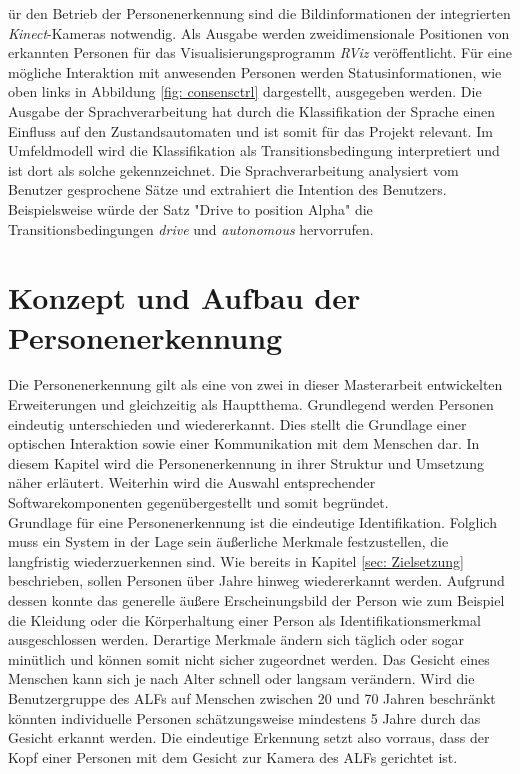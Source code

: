 	ür den Betrieb der Personenerkennung sind die Bildinformationen der integrierten \textit{Kinect}-Kameras notwendig. Als Ausgabe werden zweidimensionale Positionen von erkannten Personen für das Visualisierungsprogramm \textit{RViz} veröffentlicht. Für eine mögliche Interaktion mit anwesenden Personen werden Statusinformationen, wie oben links in Abbildung \ref{fig: consensctrl} dargestellt, ausgegeben werden. Die Ausgabe der Sprachverarbeitung hat durch die Klassifikation der Sprache einen Einfluss auf den Zustandsautomaten und ist somit für das Projekt relevant. Im Umfeldmodell wird die Klassifikation als Transitionsbedingung interpretiert und ist dort als solche gekennzeichnet. Die Sprachverarbeitung analysiert vom Benutzer gesprochene Sätze und extrahiert die Intention des Benutzers. Beispielsweise würde der Satz "Drive to position Alpha" die Transitionsbedingungen \textit{drive} und \textit{autonomous} hervorrufen. \\
		
	
	
	
	
	\section{Konzept und Aufbau der Personenerkennung}
	\label{sec: Konzept Personenerkennung}
	
	Die Personenerkennung gilt als eine von zwei in dieser Masterarbeit entwickelten Erweiterungen und gleichzeitig als Hauptthema. Grundlegend werden Personen eindeutig unterschieden und wiedererkannt. Dies stellt die Grundlage einer optischen Interaktion sowie einer Kommunikation mit dem Menschen dar. In diesem Kapitel wird die Personenerkennung in ihrer Struktur und Umsetzung näher erläutert. Weiterhin wird die Auswahl entsprechender Softwarekomponenten gegenübergestellt und somit begründet.\\
	
	Grundlage für eine Personenerkennung ist die eindeutige Identifikation. Folglich muss ein System in der Lage sein äußerliche Merkmale festzustellen, die langfristig wiederzuerkennen sind. Wie bereits in Kapitel \ref{sec: Zielsetzung} beschrieben, sollen Personen über Jahre hinweg wiedererkannt werden. Aufgrund dessen konnte das generelle äußere Erscheinungsbild der Person wie zum Beispiel die Kleidung oder die Körperhaltung einer Person als Identifikationsmerkmal ausgeschlossen werden. Derartige Merkmale ändern sich täglich oder sogar minütlich und können somit nicht sicher zugeordnet werden. Das Gesicht eines Menschen kann sich je nach Alter schnell oder langsam verändern. Wird die Benutzergruppe des ALFs auf Menschen zwischen 20 und 70 Jahren beschränkt könnten individuelle Personen schätzungsweise mindestens 5 Jahre durch das Gesicht erkannt werden. Die eindeutige Erkennung setzt also vorraus, dass der Kopf einer Personen mit dem Gesicht zur Kamera des ALFs gerichtet ist. \\ 
	
